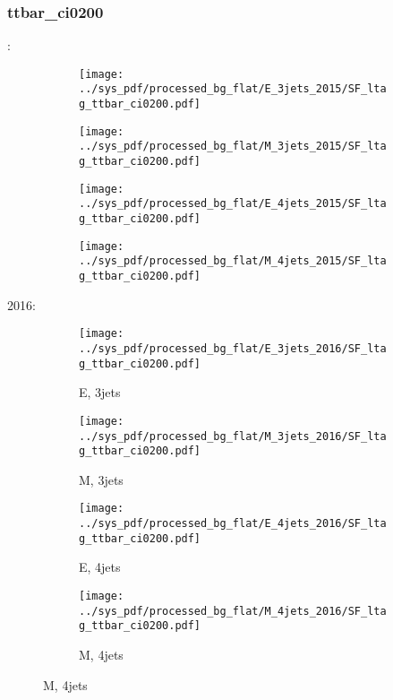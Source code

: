 \documentclass{beamer}
\begin{document}
\begin{frame}
\frametitle{ttbar_ci0200}
\fontsize{5}{1}:
\begin{figure}
\centering
\begin{subfigure}[b]{0.24\textwidth}
\texttt{[image: ../sys\_pdf/processed\_bg\_flat/E\_3jets\_2015/SF\_ltag\_ttbar\_ci0200.pdf]}
\end{subfigure}
\begin{subfigure}[b]{0.24\textwidth}
\texttt{[image: ../sys\_pdf/processed\_bg\_flat/M\_3jets\_2015/SF\_ltag\_ttbar\_ci0200.pdf]}
\end{subfigure}
\begin{subfigure}[b]{0.24\textwidth}
\texttt{[image: ../sys\_pdf/processed\_bg\_flat/E\_4jets\_2015/SF\_ltag\_ttbar\_ci0200.pdf]}
\end{subfigure}
\begin{subfigure}[b]{0.24\textwidth}
\texttt{[image: ../sys\_pdf/processed\_bg\_flat/M\_4jets\_2015/SF\_ltag\_ttbar\_ci0200.pdf]}
\end{subfigure}
\end{figure}
2016:
\begin{figure}
\centering
\begin{subfigure}[b]{0.24\textwidth}
\texttt{[image: ../sys\_pdf/processed\_bg\_flat/E\_3jets\_2016/SF\_ltag\_ttbar\_ci0200.pdf]}
\captionsetup{font=tiny}
\caption{E, 3jets}
\end{subfigure}
\begin{subfigure}[b]{0.24\textwidth}
\texttt{[image: ../sys\_pdf/processed\_bg\_flat/M\_3jets\_2016/SF\_ltag\_ttbar\_ci0200.pdf]}
\captionsetup{font=tiny}
\caption{M, 3jets}
\end{subfigure}
\begin{subfigure}[b]{0.24\textwidth}
\texttt{[image: ../sys\_pdf/processed\_bg\_flat/E\_4jets\_2016/SF\_ltag\_ttbar\_ci0200.pdf]}
\captionsetup{font=tiny}
\caption{E, 4jets}
\end{subfigure}
\begin{subfigure}[b]{0.24\textwidth}
\texttt{[image: ../sys\_pdf/processed\_bg\_flat/M\_4jets\_2016/SF\_ltag\_ttbar\_ci0200.pdf]}
\captionsetup{font=tiny}
\caption{M, 4jets}
\end{subfigure}
\end{figure}
\end{frame}
\end{document}
